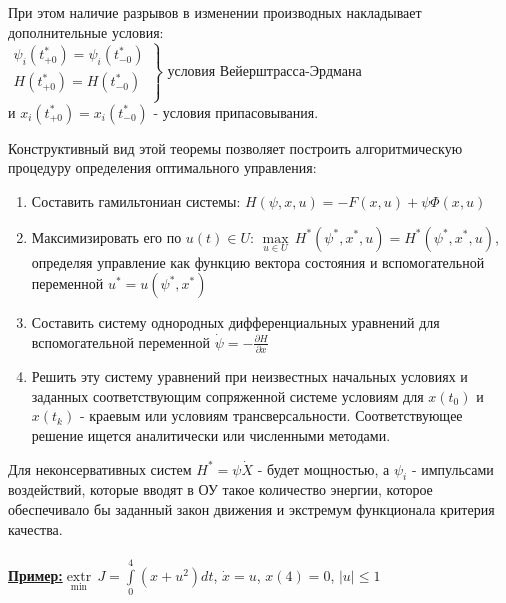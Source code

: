 \documentclass[preprint,russian,a5paper,10pt,twoside,mediummath]{ncc}
\newcommand{\ExampleMy}{\vspace{\baselineskip}\textbf{\underline{Пример:}}}
\begin{document}
При этом наличие разрывов в изменении производных накладывает дополнительные условия:
\\$\left. \begin{array}{*{35}{l}}
   {{\psi }_{i}}\left( t_{+0}^{*} \right)={{\psi }_{i}}\left( t_{-0}^{*} \right)  \\
   H\left( t_{+0}^{*} \right)=H\left( t_{-0}^{*} \right)  \\
\end{array} \right\}$ условия Вейерштрасса-Эрдмана
 \\и ${{x}_{i}}\left( t_{+0}^{*} \right)={{x}_{i}}\left( t_{-0}^{*} \right)$ - условия припасовывания.
\par Конструктивный вид этой теоремы позволяет построить алгоритмическую процедуру определения оптимального управления:
\begin{enumerate}
\item Составить гамильтониан системы: $H\left( \psi ,x,u \right)=-F\left( x,u \right)+\psi \Phi \left( x,u \right)$
\item Максимизировать его по $u\left( t \right)\in U$: $\underset{u\in U}{\mathop{\max }}\,{{H}^{*}}\left( {{\psi }^{*}},{{x}^{*}},u \right)={{H}^{*}}\left( {{\psi }^{*}},{{x}^{*}},u \right)$, определяя управление как функцию вектора состояния и вспомогательной переменной ${{u}^{*}}=u\left( {{\psi }^{*}},{{x}^{*}} \right)$
\item Составить систему однородных дифференциальных уравнений для вспомогательной переменной $\dot{\psi }=-\frac{\partial H}{\partial x}$
\item Решить эту систему уравнений при неизвестных начальных условиях и заданных соответствующим сопряженной системе условиям для $x\left( {{t}_{0}} \right)$ и $x\left( {{t}_{k}} \right)$ - краевым или условиям трансверсальности. Соответствующее решение ищется аналитически или численными методами.
\end{enumerate} 
\par Для неконсервативных систем ${{H}^{*}}=\psi \dot{X}$ - будет мощностью, а ${{\psi }_{i}}$ - импульсами воздействий, которые вводят в ОУ такое количество энергии, которое обеспечивало бы заданный закон движения и экстремум функционала критерия качества.
\\
\\
\ExampleMy   $\underset{\min }{\mathop{extr}}\,J=\int\limits_{0}^{4}{\left( x+{{u}^{2}} \right)}dt$, $\dot{x}=u$, $x\left( 4 \right)=0$, $\left| u \right|\le 1$
\end{document}
